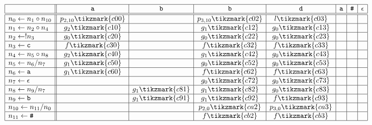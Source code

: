 \begin{figure}[h!] %
\[
\begin{array}{|l||c|c|c|c|c|c|c|c|}\hline
& \texttt{a} & \texttt{b} & \texttt{b} & \texttt{d} & \texttt{a} & \texttt{\#} &  \epsilon \\ \hline \hline
n_{0} \prodnInternal n_{1} \circ n_{10} & p_{2,10}\tikzmark{c00} & & p_{3,10}\tikzmark{c02} & l\tikzmark{c03} & & & \\ \hline
n_{1} \prodnInternal n_{2} \circ n_{4} & g_{2}\tikzmark{c10} & & g_{1}\tikzmark{c12} & g_{0}\tikzmark{c13} & & & \\ \hline
n_{2} \prodnInternal !n_{3} & g_{0}\tikzmark{c20} & & g_{0}\tikzmark{c22} & g_{0}\tikzmark{c23} & & & \\ \hline
n_{3} \prodnInternal \texttt{c} & f\tikzmark{c30} & & f\tikzmark{c32} & f\tikzmark{c33} & & & \\ \hline
n_{4} \prodnInternal n_{5} \circ n_{8} & g_{2}\tikzmark{c40} & & g_{1}\tikzmark{c42} & g_{0}\tikzmark{c43} & & & \\ \hline
n_{5} \prodnInternal n_{6} / n_{7} & g_{1}\tikzmark{c50} & & g_{0}\tikzmark{c52} & g_{0}\tikzmark{c53} & & & \\ \hline
n_{6} \prodnInternal \texttt{a} & g_{1}\tikzmark{c60} & & f\tikzmark{c62} & f\tikzmark{c63} & & & \\ \hline
n_{7} \prodnInternal \epsilon & & & g_{0}\tikzmark{c72} & g_{0}\tikzmark{c73} & & & \\ \hline
n_{8} \prodnInternal n_{9} / n_{7} & & g_{1}\tikzmark{c81} & g_{1}\tikzmark{c82} & g_{0}\tikzmark{c83} & & & \\ \hline
n_{9} \prodnInternal \texttt{b} & & g_{1}\tikzmark{c91} & g_{1}\tikzmark{c92} & f\tikzmark{c93} & & & \\ \hline
n_{10} \prodnInternal n_{11} / n_{0} & & & p_{2,0}\tikzmark{ca2} & p_{3,0}\tikzmark{ca3} & & & \\ \hline
n_{11} \prodnInternal \texttt{\#} & & & f\tikzmark{cb2} & f\tikzmark{cb3} & & & \\ \hline
\end{array}
\]
\end{figure}
